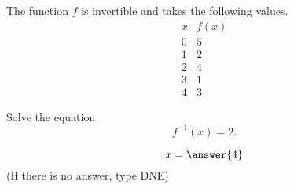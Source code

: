 \documentclass{ximera}
\author{Bobby Ramsey}
\begin{document}
\begin{exercise}




The function $f$ is invertible and takes the following values.
\[
\begin{array}{c|c}
  x & f(x)\\\hline
  0 & 5\\
  1 & 2\\
  2 & 4\\
  3 & 1\\
  4 & 3
\end{array}
\]

Solve the equation \[ f^{-1}(x) = 2. \]

\[ x = \answer{4}\]
(If there is no answer, type DNE)

\end{exercise}
\end{document}
